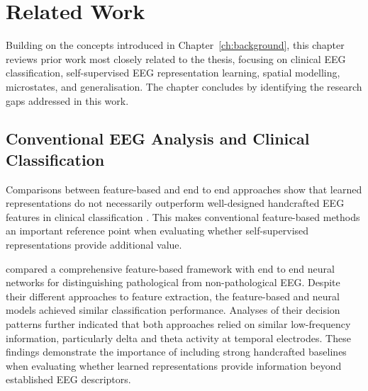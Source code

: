 
\chapter{Related Work}\label{ch:related}

Building on the concepts introduced in Chapter~\ref{ch:background}, this chapter reviews prior work most closely related to the thesis, focusing on clinical EEG classification, self-supervised EEG representation learning, spatial modelling, microstates, and generalisation. The chapter concludes by identifying the research gaps addressed in this work.


\section{Conventional EEG Analysis and Clinical Classification}\label{sec:rel_conventional}

Comparisons between feature-based and end to end approaches show that learned representations do not necessarily outperform well-designed handcrafted EEG features in clinical classification \parencite{craikDeepLearningElectroencephalogram2019,gemeinMachineLearningBasedDiagnostics2020}. This makes conventional feature-based methods an important reference point when evaluating whether self-supervised representations provide additional value.

\textcite{gemeinMachineLearningBasedDiagnostics2020} compared a comprehensive feature-based framework with end to end neural networks for distinguishing pathological from non-pathological EEG. Despite their different approaches to feature extraction, the feature-based and neural models achieved similar classification performance. Analyses of their decision patterns further indicated that both approaches relied on similar low-frequency information, particularly delta and theta activity at temporal electrodes. These findings demonstrate the importance of including strong handcrafted baselines when evaluating whether learned representations provide information beyond established EEG descriptors.

